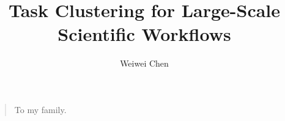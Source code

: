 



\title{Task Clustering for Large-Scale Scientific Workflows}
\author{Weiwei Chen}
\maketitle

  \begin{quote}
  To my family.
  \end{quote}

  

\newpage
\tableofcontents
\newpage
\listoftables
\newpage
{} \label{listoffig}
\listoffigures


  

\mainmatter













